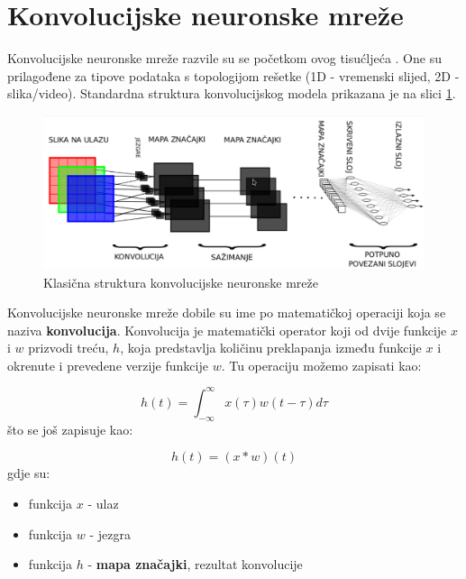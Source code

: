 \section{Konvolucijske neuronske mreže}

Konvolucijske neuronske mreže razvile su se početkom ovog tisućljeća \citep{ObjectRecognition}. One su prilagođene za tipove podataka s topologijom rešetke (1D - vremenski slijed, 2D - slika/video). Standardna struktura konvolucijskog modela prikazana je na slici \ref{img:cnn}.

\begin{figure}[htb]
\centering
\includegraphics[width=12cm]{img/CNN.png}
\caption{Klasična struktura konvolucijske neuronske mreže}
\label{img:cnn}
\end{figure}

Konvolucijske neuronske mreže dobile su ime po matematičkoj operaciji koja se naziva \textbf{konvolucija}. Konvolucija je matematički operator koji od dvije funkcije $x$ i $w$ prizvodi treću, $h$, koja predstavlja količinu preklapanja između funkcije $x$ i okrenute i prevedene verzije funkcije $w$. Tu operaciju možemo zapisati kao:

\begin{equation}
h(t) = \int_{-\infty}^{\infty} x(\tau)w(t - \tau)d\tau
\label{eq:conv_1}
\end{equation}
što se još zapisuje kao:

\begin{equation}
h(t) = (x * w)(t)
\label{eq:conv_2}
\end{equation}
gdje su:

\begin{itemize}
\item funkcija $x$ - ulaz
\item funkcija $w$ - jezgra
\item funkcija $h$ - \textbf{mapa značajki}, rezultat konvolucije
\end{itemize}


